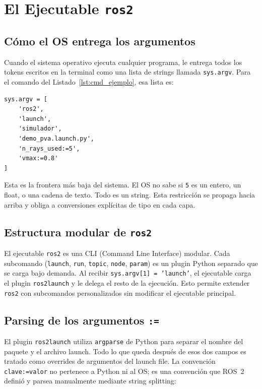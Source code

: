 \section{El Ejecutable \texttt{ros2}}

\subsection{Cómo el OS entrega los argumentos}

Cuando el sistema operativo ejecuta cualquier programa, le entrega todos los tokens escritos en la terminal como una lista de strings llamada \texttt{sys.argv}. Para el comando del Listado~\ref{lst:cmd_ejemplo}, esa lista es:

\begin{lstlisting}[style=python, caption={\texttt{sys.argv} recibido por el ejecutable \texttt{ros2}.}]
sys.argv = [
    'ros2',
    'launch',
    'simulador',
    'demo_pva.launch.py',
    'n_rays_used:=5',
    'vmax:=0.8'
]
\end{lstlisting}

Esta es la frontera más baja del sistema. El OS no sabe si \texttt{5} es un entero, un float, o una cadena de texto. Todo es un string. Esta restricción se propaga hacia arriba y obliga a conversiones explícitas de tipo en cada capa.

\subsection{Estructura modular de \texttt{ros2}}

El ejecutable \texttt{ros2} es una CLI (Command Line Interface) modular. Cada subcomando (\texttt{launch}, \texttt{run}, \texttt{topic}, \texttt{node}, \texttt{param}) es un plugin Python separado que se carga bajo demanda. Al recibir \texttt{sys.argv[1] = 'launch'}, el ejecutable carga el plugin \texttt{ros2launch} y le delega el resto de la ejecución. Esto permite extender \texttt{ros2} con subcomandos personalizados sin modificar el ejecutable principal.

\subsection{Parsing de los argumentos \texttt{:=}}

El plugin \texttt{ros2launch} utiliza \texttt{argparse} de Python para separar el nombre del paquete y el archivo launch. Todo lo que queda después de esos dos campos es tratado como overrides de argumentos del launch file. La convención \texttt{clave:=valor} no pertenece a Python ni al OS; es una convención que ROS~2 definió y parsea manualmente mediante string splitting:

